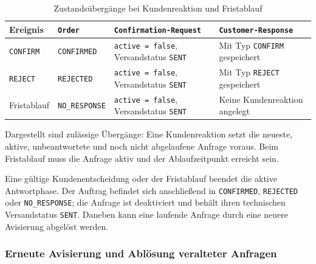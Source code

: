 \documentclass[
  12pt,
  a4paper,
  oneside
]{article}
\begin{document}
\begin{table}[htbp]
  \centering
  \caption{Zustandsübergänge bei Kundenreaktion und Fristablauf}
  \label{tab:kundenreaktion-fristablauf}
  \small
  \setlength{\tabcolsep}{4pt}
  \begin{tabularx}{\textwidth}{@{}>{\raggedright\arraybackslash}p{}>{\raggedright\arraybackslash}p{}>{\raggedright\arraybackslash}p{}>{\raggedright\arraybackslash}X@{}}
    \toprule
    Ereignis & \texttt{Order} & \texttt{Confirmation-}\newline\texttt{Request} & \texttt{Customer-}\newline\texttt{Response} \\
    \midrule
    \texttt{CONFIRM} & \texttt{CONFIRMED}
      & \texttt{active = false}, Versandstatus \texttt{SENT}
      & Mit Typ \texttt{CONFIRM} gespeichert \\
    \texttt{REJECT} & \texttt{REJECTED}
      & \texttt{active = false}, Versandstatus \texttt{SENT}
      & Mit Typ \texttt{REJECT} gespeichert \\
    Fristablauf & \texttt{NO\_RESPONSE}
      & \texttt{active = false}, Versandstatus \texttt{SENT}
      & Keine Kundenreaktion angelegt \\
    \bottomrule
  \end{tabularx}
  \par\smallskip
  \begin{minipage}{\textwidth}
    \footnotesize
    Dargestellt sind zulässige Übergänge: Eine Kundenreaktion setzt die neueste,
    aktive, unbeantwortete und noch nicht abgelaufene Anfrage voraus.
    Beim Fristablauf muss die Anfrage aktiv und der Ablaufzeitpunkt erreicht sein.
  \end{minipage}
\end{table}

Eine gültige Kundenentscheidung oder der Fristablauf beendet die aktive
Antwortphase. Der Auftrag befindet sich anschließend in
\texttt{CONFIRMED}, \texttt{REJECTED} oder \texttt{NO\_RESPONSE}; die Anfrage
ist deaktiviert und behält ihren technischen Versandstatus \texttt{SENT}.
Daneben kann eine laufende Anfrage durch eine neuere Avisierung abgelöst
werden.

\subsubsection{Erneute Avisierung und Ablösung veralteter Anfragen}
\label{sec:erneute-avisierung}
\end{document}
